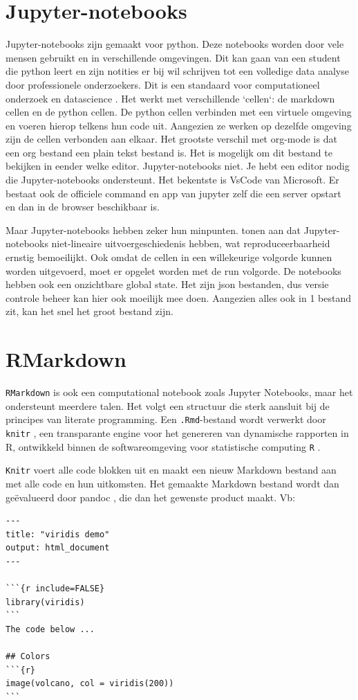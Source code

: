 \section{Jupyter-notebooks}
Jupyter-notebooks
 zijn gemaakt voor python. Deze notebooks worden door vele mensen gebruikt en in verschillende omgevingen.
Dit kan gaan van een student die python leert en zijn notities er bij wil schrijven tot een volledige data analyse door professionele onderzoekers.
Dit is een standaard voor computationeel onderzoek en datascience \autocite{jupyternotebook}.
Het werkt met verschillende `cellen`: de markdown cellen en de python cellen.
De python cellen verbinden met een virtuele omgeving en voeren hierop telkens hun code uit.
Aangezien ze werken op dezelfde omgeving zijn de cellen verbonden aan elkaar.
Het grootste verschil met org-mode is dat een org bestand een plain tekst bestand is. Het is mogelijk om dit bestand te bekijken in eender welke editor.
Jupyter-notebooks
 niet. Je hebt een editor nodig die Jupyter-notebooks ondersteunt. Het bekentste is VsCode van Microsoft.
Er bestaat ook de officiele command en app van jupyter zelf die een server opstart en dan in de browser beschikbaar is.

Maar Jupyter-notebooks hebben zeker hun minpunten.
\textcite{Rule2018} tonen aan dat Jupyter-notebooks niet-lineaire uitvoergeschiedenis hebben, wat reproduceerbaarheid ernstig bemoeilijkt.
Ook omdat de cellen in een willekeurige volgorde kunnen worden uitgevoerd, moet er opgelet worden met de run volgorde.
De notebooks hebben ook een onzichtbare global state.
Het zijn json bestanden, dus versie controle beheer kan hier ook moeilijk mee doen.
Aangezien alles ook in 1 bestand zit, kan het snel het groot bestand zijn.

\section{RMarkdown}
\texttt{RMarkdown} \autocite{RStudio2020} is ook een computational notebook zoals Jupyter Notebooks,
maar het ondersteunt meerdere talen. Het volgt een structuur die sterk aansluit bij de principes van
literate programming. Een \texttt{.Rmd}-bestand wordt verwerkt door \texttt{knitr} \autocite{Xie2025},
een transparante engine voor het genereren van dynamische rapporten in R, ontwikkeld binnen de
softwareomgeving voor statistische computing \texttt{R} \autocite{RFoundation}.

\texttt{Knitr} voert alle code blokken uit en maakt een nieuw Markdown bestand aan met alle code en hun uitkomsten.
Het gemaakte Markdown bestand wordt dan geëvalueerd door pandoc \autocite{pandoc}, die dan het gewenste product maakt.
Vb:
\begin{listing}[H]
\begin{verbatim}
---
title: "viridis demo"
output: html_document
---

```{r include=FALSE}
library(viridis)
```
The code below ...

## Colors
```{r}
image(volcano, col = viridis(200))
```
\end{verbatim}

\end{listing}

